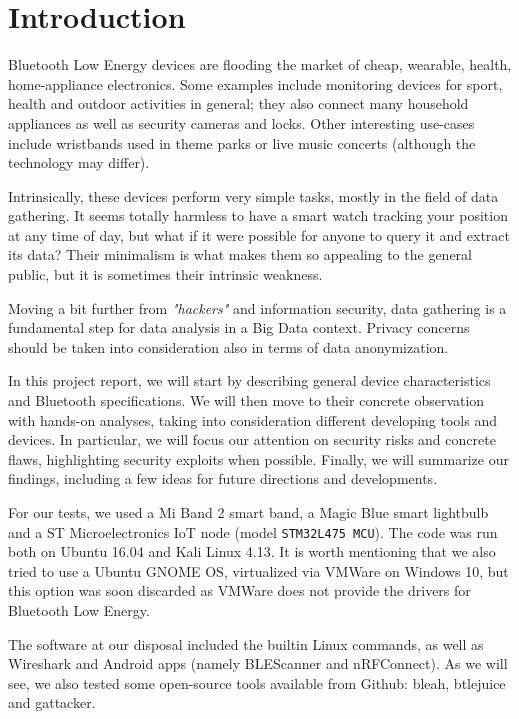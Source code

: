 \chapter{Introduction}
\label{Intro}
\thispagestyle{empty}

\noindent Bluetooth Low Energy devices are flooding the market of cheap, wearable, health, home-appliance electronics. Some examples include monitoring devices for sport, health and outdoor activities in general; they also connect many household appliances as well as security cameras and locks. Other interesting use-cases include wristbands used in theme parks or live music concerts (although the technology may differ).

Intrinsically, these devices perform very simple tasks, mostly in the field of data gathering. It seems totally harmless to have a smart watch tracking your position at any time of day, but what if it were possible for anyone to query it and extract its data? Their minimalism is what makes them so appealing to the general public, but it is sometimes their intrinsic weakness.

Moving a bit further from \textit{"hackers"} and information security, data gathering is a fundamental step for data analysis in a Big Data context. Privacy concerns should be taken into consideration also in terms of data anonymization.

In this project report, we will start by describing general device characteristics and Bluetooth specifications. We will then move to their concrete observation with hands-on analyses, taking into consideration different developing tools and devices. In particular, we will focus our attention on security risks and concrete flaws, highlighting security exploits when possible. Finally, we will summarize our findings, including a few ideas for future directions and developments.

For our tests, we used a Mi Band 2 smart band, a Magic Blue smart lightbulb and a ST Microelectronics IoT node (model \texttt{STM32L475 MCU}). The code was run both on Ubuntu 16.04 and Kali Linux 4.13. It is worth mentioning that we also tried to use a Ubuntu GNOME OS, virtualized via VMWare on Windows 10, but this option was soon discarded as VMWare does not provide the drivers for Bluetooth Low Energy.

The software at our disposal included the builtin Linux commands, as well as Wireshark and Android apps (namely BLEScanner and nRFConnect). As we will see, we also tested some open-source tools available from Github: bleah, btlejuice and gattacker.